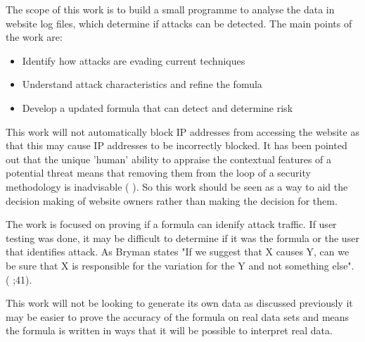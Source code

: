 The scope of this work is to build a small programme to analyse the data in website log files, which determine if attacks can be detected. The main points of the work are:
\begin{itemize}
    \item Identify how attacks are evading current techniques 
    \item Understand attack characteristics and refine the fomula
    \item Develop a updated formula that can detect and determine risk
\end{itemize}

This work will not automatically block IP addresses from accessing the website as that this may cause IP addresses to be incorrectly blocked. It has been pointed out that the unique 'human' ability to appraise the contextual features of a potential threat means that removing them from the loop of a security methodology is inadvisable (\cite{TargetedCyberSecurity} ). So this work should be seen as a way to aid the decision making of website owners rather than making the decision for them. 


The work is focused on proving if a formula can idenify attack traffic. If user testing was done, it may be difficult to determine if it was the formula or the user that identifies attack. As Bryman states  "If we suggest that X causes Y, can we be sure that X is responsible for the variation for the Y and not something else". (\citeauthor{bryman_2016} \citeyear{bryman_2016};41).

This work will not be looking to generate its own data as discussed previously it may be easier to prove the accuracy of the formula on real data sets and  means the formula is written in ways that it will be possible to interpret real data.